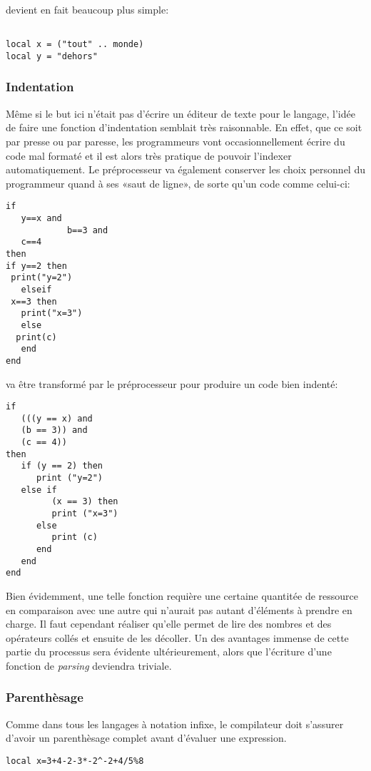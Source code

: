 \documentclass{article}
\begin{document}
\newpage
devient en fait beaucoup plus simple:
\begin{lstlisting}[belowcaptionskip = -1\baselineskip]

local x = ("tout" .. monde) 
local y = "dehors"
\end{lstlisting}

\subsubsection{Indentation}
Même si le but ici n'était pas d'écrire un éditeur de texte pour le langage, l'idée de faire une fonction d'indentation semblait très raisonnable. En effet, que ce soit par presse ou par paresse, les programmeurs vont occasionnellement écrire du code mal formaté et il est alors très pratique de pouvoir l'indexer automatiquement. Le préprocesseur va également conserver les choix personnel du programmeur quand à ses «saut de ligne», de sorte qu'un code comme celui-ci:
\begin{lstlisting}[caption={Code mal formaté},label=DescriptiveLabel]
if
   y==x and
            b==3 and
   c==4
then
if y==2 then
 print("y=2")
   elseif
 x==3 then
   print("x=3")
   else
  print(c)
   end
end
\end{lstlisting}
va être transformé par le préprocesseur pour produire un code bien indenté:
\begin{lstlisting}[belowcaptionskip = -1\baselineskip]
if 
   (((y == x) and 
   (b == 3)) and 
   (c == 4)) 
then 
   if (y == 2) then 
      print ("y=2") 
   else if 
         (x == 3) then 
         print ("x=3") 
      else 
         print (c) 
      end 
   end 
end 
\end{lstlisting}

Bien évidemment, une telle fonction requière une certaine quantitée de ressource en comparaison avec une autre qui n'aurait pas autant d'éléments à prendre en charge. Il faut cependant réaliser qu'elle permet de lire des nombres et des opérateurs collés et ensuite de les décoller. Un des avantages immense de cette partie du processus sera évidente ultérieurement, alors que l'écriture d'une fonction de \textit{parsing} deviendra triviale.

\newpage
\subsubsection{Parenthèsage}
Comme dans tous les langages à notation infixe, le compilateur doit s'assurer d'avoir un parenthèsage complet avant d'évaluer une expression.
\begin{lstlisting}[caption={Parenthèsage incomplet},label=DescriptiveLabel]
  local x=3+4-2-3*-2^-2+4/5%8
\end{lstlisting}
\end{document}
